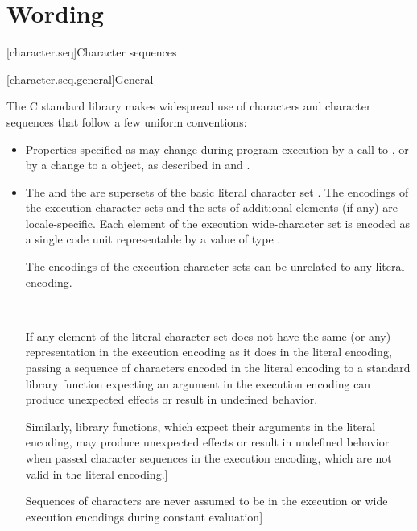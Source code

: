 \documentclass{wg21}
\begin{document}
\section{Wording}

[character.seq]{Character sequences}

[character.seq.general]{General}

\pnum
The C standard library makes widespread use
%
of characters and character sequences that follow a few uniform conventions:

\begin{itemize}
\item
Properties specified as 
may change during program execution
by a call to  , or
by a change to a  object,
as described in  and .
\item
The  and
the 
are supersets of the basic literal character set .
The encodings of the execution character sets and
the sets of additional elements (if any) are locale-specific.
Each element of the execution wide-character set is encoded as
a single code unit representable by a value of type .
\begin{removedblock}
\begin{note}
The encodings of the execution character sets can be unrelated
to any literal encoding.
\end{note}
\end{removedblock}\\
\begin{addedblock}
\begin{note}
If any element of the literal character set does not have the same (or any) representation in the execution encoding as it does in the literal encoding, passing a sequence of characters encoded in the literal encoding to a standard library function expecting an argument in the execution encoding can produce unexpected effects or result in undefined behavior.


Similarly, library functions, which expect their arguments in the literal encoding, may produce unexpected effects or result in undefined behavior when passed character sequences in the execution encoding, which are not valid in the literal encoding.]
\end{note}

\begin{note}
Sequences of characters are never assumed to be in the execution or wide execution encodings during constant evaluation]
\end{note}
\end{addedblock}

\end{itemize}
\end{document}
